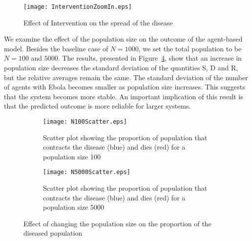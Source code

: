 
\begin{figure}[h!]
\begin{center}
\texttt{[image: InterventionZoomIn.eps]}
\end{center}
\caption{Effect of Intervention on the spread of the disease }
\label{fig:Intervention}
\end{figure}


We examine the effect of the population size on the outcome of the agent-based model. Besides the baseline case of $N = 1000$, we set the total population to be $N = 100$ and $5000$. The results, presented in Figure~\ref{fig:VarPopSize}, show that an increase in population size decreases the standard deviation of the quantities S, D and R, but the relative averages remain the same. The standard deviation of the number of agents with Ebola becomes smaller as population size increases. This suggests that the system becomes more stable. An important implication of this result is that the predicted outcome is more reliable for larger systems.


\begin{figure} 
\centering 
\begin{subfigure}[b]{0.3\textwidth} \texttt{[image: N100Scatter.eps]} \caption{Scatter plot showing the proportion of population that contracts the disease (blue) and dies (red) for a population size 100} \label{fig:N100} \end{subfigure} 
\hfill 
 \begin{subfigure}[b]{0.3\textwidth} \texttt{[image: N5000Scatter.eps]} \caption{Scatter plot showing the proportion of population that contracts the disease (blue) and dies (red) for a population size 5000} \label{fig:N5000} \end{subfigure} 
 \caption{Effect of changing the population size on the proportion of the diseased population}\label{fig:VarPopSize}
  \end{figure}










